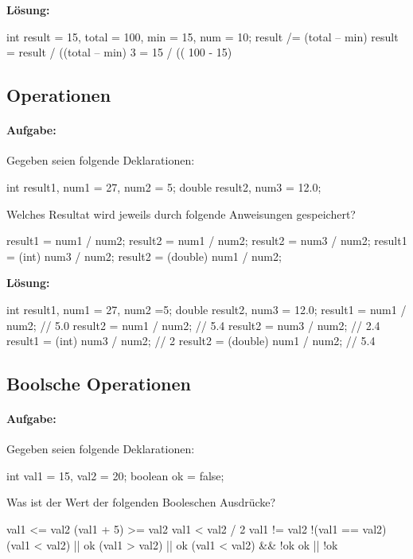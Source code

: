 \documentclass[a4paper,10pt, dvipsnames]{report}
\begin{document}
\textbf{Lösung:}
\begin{javacodebox}
int result = 15, total = 100, min = 15, num = 10;
result /= (total – min) %
result = result / ((total – min) %
3 = 15 / (( 100 - 15) %
\end{javacodebox}

\subsection{Operationen}

\paragraph{Aufgabe:}
Gegeben seien folgende Deklarationen:
\begin{javacodebox}
int result1, num1 = 27, num2 = 5;
double result2, num3 = 12.0;
\end{javacodebox}

Welches Resultat wird jeweils durch folgende Anweisungen gespeichert?
\begin{javacodebox}
result1 = num1 / num2;
result2 = num1 / num2;
result2 = num3 / num2;
result1 = (int) num3 / num2;
result2 = (double) num1 / num2;
\end{javacodebox}

\textbf{Lösung:}
\begin{javacodebox}
int result1, num1 = 27, num2 =5;
double result2, num3 = 12.0;
result1 = num1 / num2; // 5.0
result2 = num1 / num2; // 5.4
result2 = num3 / num2; // 2.4
result1 = (int) num3 / num2; // 2
result2 = (double) num1 / num2; // 5.4
\end{javacodebox}

\subsection{Boolsche Operationen}

\paragraph{Aufgabe:}
Gegeben seien folgende Deklarationen:
\begin{javacodebox}
int val1 = 15, val2 = 20;
boolean ok = false;
\end{javacodebox}

Was ist der Wert der folgenden Booleschen Ausdrücke?
\begin{javacodebox}
val1 <= val2
(val1 + 5) >= val2
val1 < val2 / 2
val1 != val2
!(val1 == val2)
(val1 < val2) || ok
(val1 > val2) || ok
(val1 < val2) && !ok
ok || !ok   
\end{javacodebox}
\end{document}
